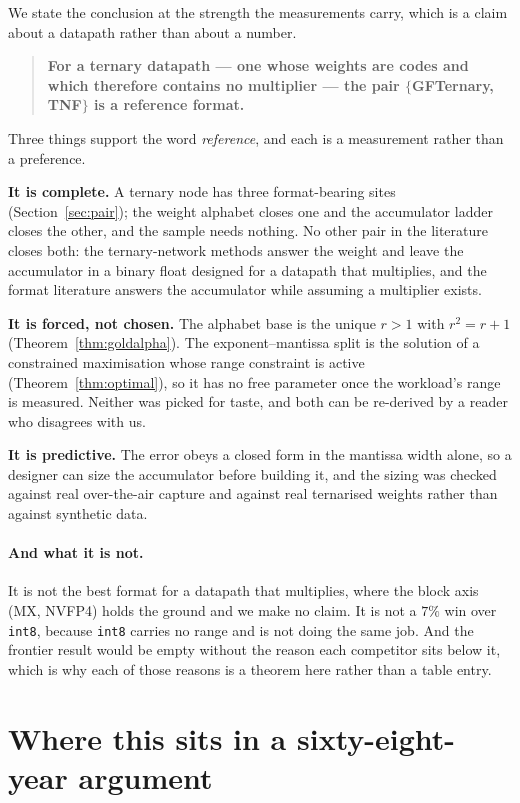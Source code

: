 \documentclass[11pt]{article}
\theoremstyle{definition}
\begin{document}
We state the conclusion at the strength the measurements carry, which is a claim
about a datapath rather than about a number.

\begin{quote}
\textbf{For a ternary datapath --- one whose weights are codes and which therefore
contains no multiplier --- the pair $\{$GFTernary, TNF$\}$ is a reference format.}
\end{quote}

Three things support the word \emph{reference}, and each is a measurement rather
than a preference.

\textbf{It is complete.} A ternary node has three format-bearing sites
(Section~\ref{sec:pair}); the weight alphabet closes one and the accumulator
ladder closes the other, and the sample needs nothing. No other pair in the
literature closes both: the ternary-network methods answer the weight and leave
the accumulator in a binary float designed for a datapath that multiplies, and the
format literature answers the accumulator while assuming a multiplier exists.

\textbf{It is forced, not chosen.} The alphabet base is the unique $r>1$ with
$r^2=r+1$ (Theorem~\ref{thm:goldalpha}). The exponent--mantissa split is the
solution of a constrained maximisation whose range constraint is active
(Theorem~\ref{thm:optimal}), so it has no free parameter once the workload's
range is measured. Neither was picked for taste, and both can be re-derived by a
reader who disagrees with us.

\textbf{It is predictive.} The error obeys a closed form in the mantissa width
alone, so a designer can size the accumulator before building it, and the sizing
was checked against real over-the-air capture and against real ternarised weights
rather than against synthetic data.

\paragraph{And what it is not.} It is not the best format for a datapath that
multiplies, where the block axis (MX, NVFP4) holds the ground and we make no
claim. It is not a $7\%$ win over \texttt{int8}, because \texttt{int8} carries no
range and is not doing the same job. And the frontier result would be empty
without the reason each competitor sits below it, which is why each of those
reasons is a theorem here rather than a table entry.



\section{Where this sits in a sixty-eight-year argument}
\label{sec:history}
\end{document}
